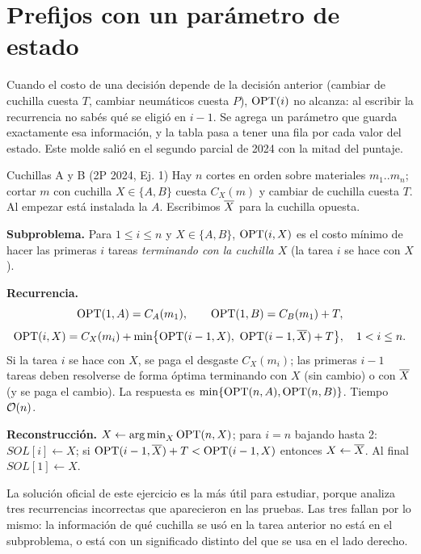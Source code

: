 \section{Prefijos con un parámetro de estado}

Cuando el costo de una decisión depende de la decisión anterior (cambiar de
cuchilla cuesta $T$, cambiar neumáticos cuesta $P$), $\mathrm{OPT}(i)$ no alcanza: al
escribir la recurrencia no sabés qué se eligió en $i-1$. Se agrega un
parámetro que guarda exactamente esa información, y la tabla pasa a tener
una fila por cada valor del estado. Este molde salió en el segundo parcial
de 2024 con la mitad del puntaje.

\begin{problema}{Cuchillas A y B (2P 2024, Ej. 1)}
Hay $n$ cortes en orden sobre materiales $m_1..m_n$; cortar $m$ con cuchilla
$X\in\{A,B\}$ cuesta $C_X(m)$ y cambiar de cuchilla cuesta $T$. Al empezar
está instalada la $A$. Escribimos $\overline{X}$ para la cuchilla opuesta.

\textbf{Subproblema.} Para $1\le i\le n$ y $X\in\{A,B\}$, $\mathrm{OPT}(i,X)$ es el
costo mínimo de hacer las primeras $i$ tareas \emph{terminando con la
cuchilla $X$} (la tarea $i$ se hace con $X$).

\textbf{Recurrencia.}
\[
\mathrm{OPT}(1,A)=C_A(m_1),\qquad \mathrm{OPT}(1,B)=C_B(m_1)+T,
\]
\[
\OPT(i,X)=C_X(m_i)+\min\bigl\{\OPT(i-1,X),\ \OPT(i-1,\pdbar{X})+T\bigr\},\quad 1<i\le n.
\]
Si la tarea $i$ se hace con $X$, se paga el desgaste $C_X(m_i)$; las
primeras $i-1$ tareas deben resolverse de forma óptima terminando con $X$
(sin cambio) o con $\overline{X}$ (y se paga el cambio). La respuesta es
$\min\{\mathrm{OPT}(n,A),\mathrm{OPT}(n,B)\}$. Tiempo $\mathcal{O}(n)$.

\textbf{Reconstrucción.} $X\gets\operatorname*{arg\,min}_X\mathrm{OPT}(n,X)$; para $i=n$ bajando
hasta 2: $\mathit{SOL}[i]\gets X$; si $\mathrm{OPT}(i-1,\overline{X})+T<\mathrm{OPT}(i-1,X)$ entonces
$X\gets\overline{X}$. Al final $\mathit{SOL}[1]\gets X$.
\end{problema}

La solución oficial de este ejercicio es la más útil para estudiar, porque
analiza tres recurrencias incorrectas que aparecieron en las pruebas. Las
tres fallan por lo mismo: la información de qué cuchilla se usó en la tarea
anterior no está en el subproblema, o está con un significado distinto del
que se usa en el lado derecho.

